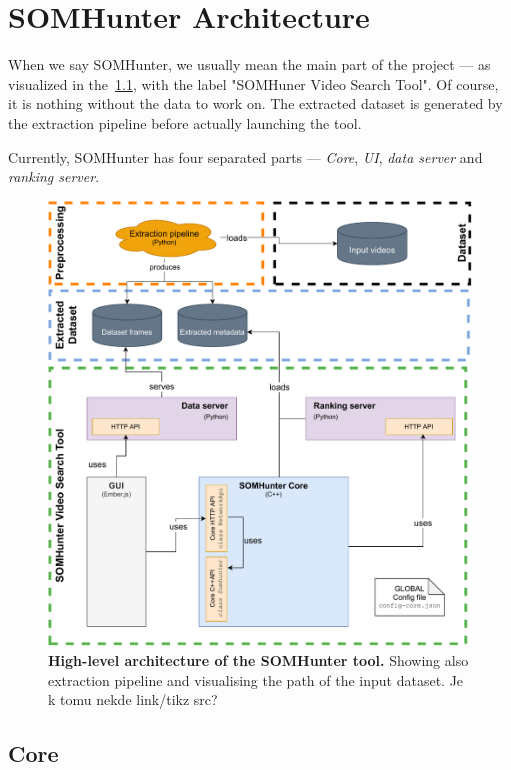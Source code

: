 \chapter{SOMHunter Architecture}
\label{arch}


When we say SOMHunter, we usually mean the main part of the project --- as visualized in the~\cref{fig:sh-arch}, with the label "SOMHuner Video Search Tool". Of course, it is nothing without the data to work on. The extracted dataset is generated by the extraction pipeline before actually launching the tool.

Currently, SOMHunter has four separated parts --- \emph{Core}, \emph{UI}, \emph{data server} and \emph{ranking server}.


\begin{figure}[b]
	\centering
	\includegraphics[width=1.0\textwidth]{img/diagrams/sh-arch.pdf}
	\caption{\textbf{High-level architecture of the SOMHunter tool.} Showing also extraction pipeline and visualising the path of the input dataset. {\color{red}Je k tomu nekde link/tikz src?}}
	\label{fig:sh-arch}
\end{figure}

\section{Core}

